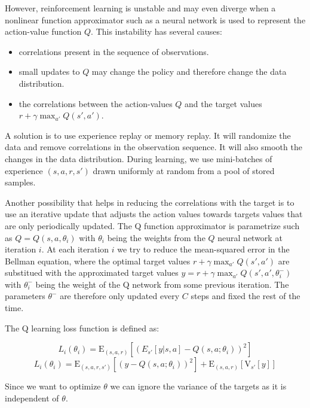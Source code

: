 \documentclass[12pt]{article}
\begin{document}
However, reinforcement learning is unstable and may even diverge when a nonlinear function approximator such as a neural network is used to represent the action-value function $Q$.
This instability has several causes:

\begin{itemize}
\item correlations present in the sequence of observations.
\item small updates to $Q$ may change the policy and therefore change the data distribution.
\item the correlations between the action-values $Q$ and the target values $r + \gamma \max_{a'} Q(s',a')$.
\end{itemize}

A solution is to use experience replay or memory replay. 
It will randomize the data and remove correlations in the observation sequence. 
It will also smooth the changes in the data distribution. 
During learning, we use mini-batches of experience $(s,a,r,s')$ drawn uniformly at random from a pool of stored samples.

Another possibility that helps in reducing the correlations with the target is to use an iterative update that adjusts the action values towards targets values that are only periodically updated.
The Q function approximator is parametrize such as $Q=Q(s,a,\theta_{i})$ with $\theta_i$ being the weights from the $Q$ neural network at iteration $i$.
At each iteration $i$ we try to reduce the mean-squared error in the Bellman equation, where the optimal target values $r+\gamma  \max_{a'} Q(s',a')$ are substitued with the approximated target values $y=r+\gamma  \max_{a'} Q(s',a',\theta_i^-)$ with $\theta_i^-$ being the weight of the Q network from some previous iteration.
The parameters $\theta^-$ are therefore only updated every $C$ steps and fixed the rest of the time.

The Q learning loss function is defined as:

\begin{equation} 
 	L_{i}(\theta_{i}) =\mathrm{E}_{(s,a,r)}[( E_{s'}[y|s,a]-Q(s,a;\theta_i))^2]
\end{equation}
\begin{equation} 
	L_{i}(\theta_{i}) =\mathrm{E}_{(s,a,r,s')}[(y-Q(s,a;\theta_i))^2]+\mathrm{E}_{(s,a,r)} [\mathrm{V}_{s'}[y]]
\end{equation} 

Since we want to optimize $\theta$ we can ignore the variance of the targets as it is independent of $\theta$.
\end{document}
